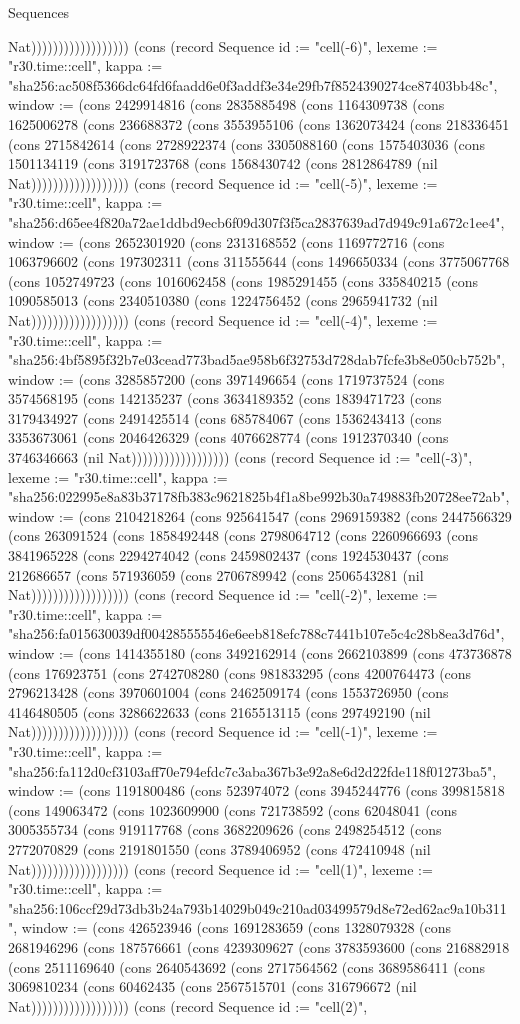 \begin{lexlean}{Sequences}
\begin{semanticmodule}
{Nat)))))))))))))))))}) (cons (record Sequence {id := "cell(-6)", lexeme := "r30.time::cell", kappa := "sha256:ac508f5366dc64fd6faadd6e0f3addf3e34e29fb7f8524390274ce87403bb48c", window := (cons 2429914816 (cons 2835885498 (cons 1164309738 (cons 1625006278 (cons 236688372 (cons 3553955106 (cons 1362073424 (cons 218336451 (cons 2715842614 (cons 2728922374 (cons 3305088160 (cons 1575403036 (cons 1501134119 (cons 3191723768 (cons 1568430742 (cons 2812864789 (nil Nat)))))))))))))))))}) (cons (record Sequence {id := "cell(-5)", lexeme := "r30.time::cell", kappa := "sha256:d65ee4f820a72ae1ddbd9ecb6f09d307f3f5ca2837639ad7d949c91a672c1ee4", window := (cons 2652301920 (cons 2313168552 (cons 1169772716 (cons 1063796602 (cons 197302311 (cons 311555644 (cons 1496650334 (cons 3775067768 (cons 1052749723 (cons 1016062458 (cons 1985291455 (cons 335840215 (cons 1090585013 (cons 2340510380 (cons 1224756452 (cons 2965941732 (nil Nat)))))))))))))))))}) (cons (record Sequence {id := "cell(-4)", lexeme := "r30.time::cell", kappa := "sha256:4bf5895f32b7e03cead773bad5ae958b6f32753d728dab7fcfe3b8e050cb752b", window := (cons 3285857200 (cons 3971496654 (cons 1719737524 (cons 3574568195 (cons 142135237 (cons 3634189352 (cons 1839471723 (cons 3179434927 (cons 2491425514 (cons 685784067 (cons 1536243413 (cons 3353673061 (cons 2046426329 (cons 4076628774 (cons 1912370340 (cons 3746346663 (nil Nat)))))))))))))))))}) (cons (record Sequence {id := "cell(-3)", lexeme := "r30.time::cell", kappa := "sha256:022995e8a83b37178fb383c9621825b4f1a8be992b30a749883fb20728ee72ab", window := (cons 2104218264 (cons 925641547 (cons 2969159382 (cons 2447566329 (cons 263091524 (cons 1858492448 (cons 2798064712 (cons 2260966693 (cons 3841965228 (cons 2294274042 (cons 2459802437 (cons 1924530437 (cons 212686657 (cons 571936059 (cons 2706789942 (cons 2506543281 (nil Nat)))))))))))))))))}) (cons (record Sequence {id := "cell(-2)", lexeme := "r30.time::cell", kappa := "sha256:fa015630039df004285555546e6eeb818efc788c7441b107e5c4c28b8ea3d76d", window := (cons 1414355180 (cons 3492162914 (cons 2662103899 (cons 473736878 (cons 176923751 (cons 2742708280 (cons 981833295 (cons 4200764473 (cons 2796213428 (cons 3970601004 (cons 2462509174 (cons 1553726950 (cons 4146480505 (cons 3286622633 (cons 2165513115 (cons 297492190 (nil Nat)))))))))))))))))}) (cons (record Sequence {id := "cell(-1)", lexeme := "r30.time::cell", kappa := "sha256:fa112d0cf3103aff70e794efdc7c3aba367b3e92a8e6d2d22fde118f01273ba5", window := (cons 1191800486 (cons 523974072 (cons 3945244776 (cons 399815818 (cons 149063472 (cons 1023609900 (cons 721738592 (cons 62048041 (cons 3005355734 (cons 919117768 (cons 3682209626 (cons 2498254512 (cons 2772070829 (cons 2191801550 (cons 3789406952 (cons 472410948 (nil Nat)))))))))))))))))}) (cons (record Sequence {id := "cell(1)", lexeme := "r30.time::cell", kappa := "sha256:106ccf29d73db3b24a793b14029b049c210ad03499579d8e72ed62ac9a10b311", window := (cons 426523946 (cons 1691283659 (cons 1328079328 (cons 2681946296 (cons 187576661 (cons 4239309627 (cons 3783593600 (cons 216882918 (cons 2511169640 (cons 2640543692 (cons 2717564562 (cons 3689586411 (cons 3069810234 (cons 60462435 (cons 2567515701 (cons 316796672 (nil Nat)))))))))))))))))}) (cons (record Sequence {id := "cell(2)", }
\end{semanticmodule}
\end{lexlean}
